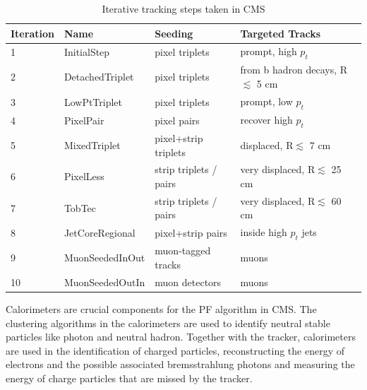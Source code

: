\begin{table}[!tpb]
\caption{Iterative tracking steps taken in CMS \label{tbl:iterative_tracking}}
\label{tab:antil}
\begin{center}
\begin{tabular}{|llll|}   
\hline
Iteration                   &  Name               &   Seeding            &  Targeted Tracks  \\\hline
1                              & InitialStep          & pixel triplets        &  prompt, high $p_{t}$   \\
2                              & DetachedTriplet          & pixel triplets        &  from b hadron decays, R$\lesssim$ 5 cm  \\
3                              & LowPtTriplet          & pixel triplets        &  prompt, low $p_{t}$ \\
4                              & PixelPair          & pixel pairs                &  recover high $p_{t}$ \\
5                              & MixedTriplet          & pixel+strip triplets                &  displaced,  R$\lesssim$ 7 cm   \\
6                              & PixelLess          & strip triplets / pairs               &  very displaced, R$\lesssim$ 25 cm     \\
7                              & TobTec          & strip triplets / pairs               &  very displaced, R$\lesssim$ 60 cm     \\
8                              & JetCoreRegional          & pixel+strip pairs               &  inside high $p_{t}$ jets    \\
9                              & MuonSeededInOut          & muon-tagged tracks               &  muons   \\
10                            & MuonSeededOutIn          & muon detectors                &  muons   \\\hline
\end{tabular}
\end{center}
\end{table}


Calorimeters are crucial components for the PF algorithm in CMS. The clustering algorithms in the calorimeters are used to identify neutral stable particles like photon and neutral hadron. Together with the tracker, calorimeters are used in the identification of charged particles, reconstructing the energy of electrons and the possible associated bremsstrahlung photons and measuring the energy of charge particles that are missed by the tracker.  

